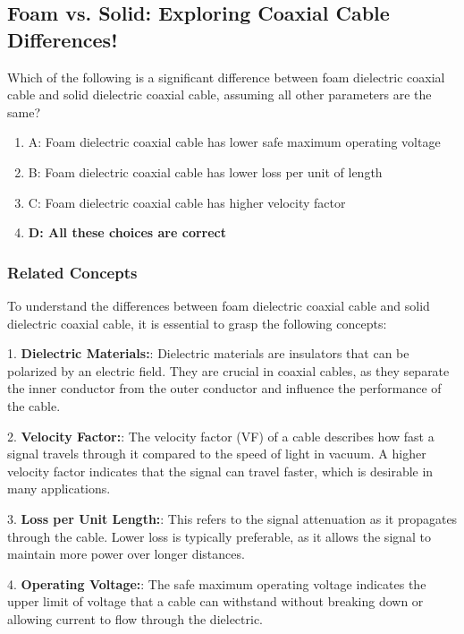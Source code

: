 \subsection{Foam vs. Solid: Exploring Coaxial Cable Differences!}

\begin{tcolorbox}[colback=gray!10, colframe=black, title=E9F08] Which of the following is a significant difference between foam dielectric coaxial cable and solid dielectric coaxial cable, assuming all other parameters are the same? 
\begin{enumerate}
    \item A: Foam dielectric coaxial cable has lower safe maximum operating voltage
    \item B: Foam dielectric coaxial cable has lower loss per unit of length
    \item C: Foam dielectric coaxial cable has higher velocity factor
    \item \textbf{D: All these choices are correct}
\end{enumerate} \end{tcolorbox}

\subsubsection{Related Concepts}

To understand the differences between foam dielectric coaxial cable and solid dielectric coaxial cable, it is essential to grasp the following concepts:

1. \textbf{Dielectric Materials:}: Dielectric materials are insulators that can be polarized by an electric field. They are crucial in coaxial cables, as they separate the inner conductor from the outer conductor and influence the performance of the cable.

2. \textbf{Velocity Factor:}: The velocity factor (VF) of a cable describes how fast a signal travels through it compared to the speed of light in vacuum. A higher velocity factor indicates that the signal can travel faster, which is desirable in many applications.

3. \textbf{Loss per Unit Length:}: This refers to the signal attenuation as it propagates through the cable. Lower loss is typically preferable, as it allows the signal to maintain more power over longer distances.

4. \textbf{Operating Voltage:}: The safe maximum operating voltage indicates the upper limit of voltage that a cable can withstand without breaking down or allowing current to flow through the dielectric.

